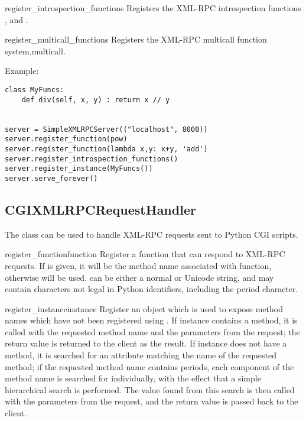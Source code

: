 \begin{methoddesc}{register_introspection_functions}{}
  Registers the XML-RPC introspection functions ,
   and . 
\end{methoddesc}

\begin{methoddesc}{register_multicall_functions}{}
  Registers the XML-RPC multicall function system.multicall.
\end{methoddesc}

Example:

\begin{verbatim}
class MyFuncs:
    def div(self, x, y) : return x // y


server = SimpleXMLRPCServer(("localhost", 8000))
server.register_function(pow)
server.register_function(lambda x,y: x+y, 'add')
server.register_introspection_functions()
server.register_instance(MyFuncs())
server.serve_forever()
\end{verbatim}

\subsection{CGIXMLRPCRequestHandler}

The  class can be used to 
handle XML-RPC requests sent to Python CGI scripts.

\begin{methoddesc}{register_function}{function}
Register a function that can respond to XML-RPC requests. If 
 is given, it will be the method name associated with 
function, otherwise  will be used. 
can be either a normal or Unicode string, and may contain 
characters not legal in Python identifiers, including the period
character. 
\end{methoddesc}

\begin{methoddesc}{register_instance}{instance}
Register an object which is used to expose method names 
which have not been registered using . If 
instance contains a  method, it is called with the 
requested method name and the parameters from the 
request; the return value is returned to the client as the result.
If instance does not have a  method, it is searched 
for an attribute matching the name of the requested method; if 
the requested method name contains periods, each 
component of the method name is searched for individually, 
with the effect that a simple hierarchical search is performed. 
The value found from this search is then called with the 
parameters from the request, and the return value is passed 
back to the client. 
\end{methoddesc}

